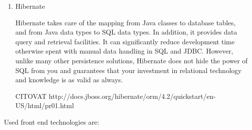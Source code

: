 \documentclass[thesis=B,english]{FITthesis}[2012/10/20]
\begin{document}
\begin{enumerate}
\item{Hibernate}

Hibernate takes care of the mapping from Java classes to database tables, and from Java data types to SQL data types. In addition, it provides data query and retrieval facilities. It can significantly reduce development time otherwise spent with manual data handling in SQL and JDBC. However, unlike many other persistence solutions, Hibernate does not hide the power of SQL from you and guarantees that your investment in relational technology and knowledge is as valid as always.

CITOVAT http://docs.jboss.org/hibernate/orm/4.2/quickstart/en-US/html/pr01.html

\end{enumerate}


Used front end technologies are: 
\end{document}
